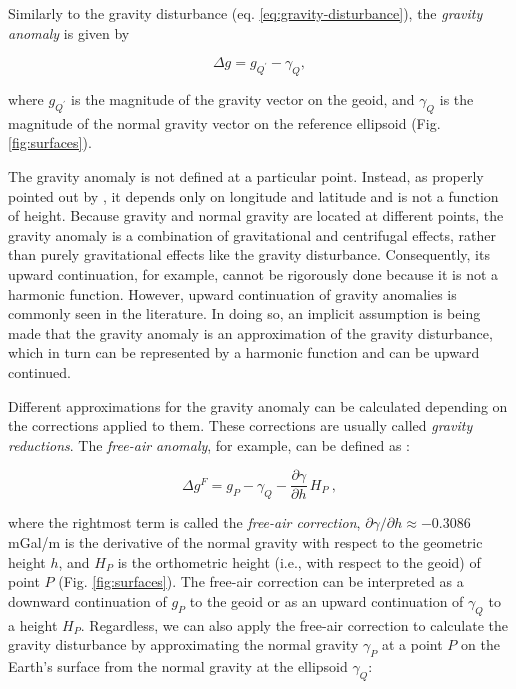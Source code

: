\documentclass[extra]{gji}
\begin{document}
Similarly to the gravity disturbance (eq. \ref{eq:gravity-disturbance}),
the \textit{gravity anomaly} is given by

\begin{equation}
\Delta g = g_{Q^{\prime}} - \gamma_{Q} ,
\label{eq:gravity-anomaly}
\end{equation}

\noindent
where $g_{Q^{\prime}}$ is the magnitude of the gravity vector on the geoid,
and $\gamma_{Q}$ is the magnitude of the normal gravity vector
on the reference ellipsoid (Fig. \ref{fig:surfaces}).

The gravity anomaly is not defined at a particular point.
Instead, as properly pointed out by \citet{barthelmes2013},
it depends only on longitude and latitude and is not a function of height.
Because gravity and normal gravity are located at different points,
the gravity anomaly is a combination of gravitational and centrifugal effects,
rather than purely gravitational effects like the gravity disturbance.
Consequently, its upward continuation, for example, cannot be rigorously done
because it is not a harmonic function.
However, upward continuation of gravity anomalies is commonly seen in the
literature.
In doing so, an implicit assumption is being made that the gravity anomaly is
an approximation of the gravity disturbance,
which in turn can be represented by a harmonic function and can be upward
continued.

Different approximations for the gravity anomaly can be calculated
depending on the corrections applied to them.
These corrections are usually called \textit{gravity reductions}.
The \textit{free-air anomaly}, for example, can be defined as
\citep{blakely1996, hofmann-wellenhof-moritz2005}:

\begin{equation}
\Delta g^{F} = g_{P}
- \gamma_{Q} - \frac{\partial \gamma}{\partial h} \, H_{P} \: ,
\label{eq:free-air-anomaly}
\end{equation}

\noindent
where the rightmost term is called the \textit{free-air correction},
$\partial \gamma/\partial h \approx -0.3086$ mGal/m is the
derivative of the normal gravity with respect to the geometric height $h$,
and $H_{P}$ is the orthometric height (i.e., with respect to the geoid)
of point $P$ (Fig. \ref{fig:surfaces}).
The free-air correction can be interpreted as a downward continuation of
$g_P$ to the geoid or as an upward continuation of $\gamma_Q$ to a height
$H_P$.
Regardless, we can also apply the free-air correction
to calculate the gravity disturbance by
approximating the normal gravity $\gamma_{P}$
at a point $P$ on the Earth's surface
from the normal gravity at the ellipsoid $\gamma_{Q}$:
\end{document}
